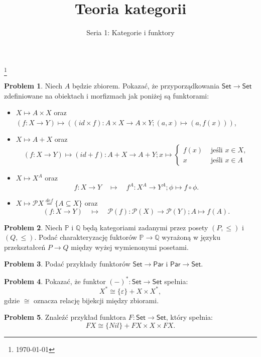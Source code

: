 \documentclass[10pt]{amsart}
\title{Teoria kategorii}
\author{Seria 1: Kategorie i funktory}
\theoremstyle{plain}
\theoremstyle{definition}
\newtheorem{problem}{Problem}
\numberwithin{equation}{section}
\newcommand\blfootnote[1]{%
  \begingroup
  \renewcommand\thefootnote{}\footnote{#1}%
  \addtocounter{footnote}{-1}%
  \endgroup
}
\begin{document}
\maketitle

\blfootnote{\today}


\begin{problem}
Niech $A$ będzie zbiorem. Pokazać, że przyporządkowania $\mathsf{Set}\to \mathsf{Set}$ zdefiniowane na obiektach i morfizmach jak poniżej są funktorami:
\begin{itemize}
\item $X\mapsto A\times X$ oraz $(f:X\to Y)\mapsto \left ((id \times f):A\times X\to A\times Y; (a,x)\mapsto (a,f(x))\right )$,
\item $X\mapsto A+ X$ oraz $$(f:X\to Y)\mapsto (id + f):A+ X\to A+ Y; x \mapsto \left \{ \begin{array}{cc}f(x)  &\text{ jeśli }x\in X, \\ x &\text{ jeśli }x\in A \end{array}\right. $$
\item $X\mapsto X^A$ oraz 
$$
f:X\to Y\quad \mapsto \quad f^A:X^A\to Y^A; \phi\mapsto f\circ \phi. 
$$
\item $X\mapsto \mathcal{P}X\stackrel{def}{=} \{ A\subseteq X \}$ oraz 
$$
(f:X\to Y)\quad \mapsto \quad \mathcal{P}(f):\mathcal{P}(X)\to \mathcal{P}(Y); A\mapsto f(A). 
$$
\end{itemize}
\end{problem}
%
\begin{problem}
Niech $\mathbb{P}$ i $\mathbb{Q}$ będą kategoriami zadanymi przez posety $(P,\leq)$ i $(Q,\leq)$. Podać charakteryzację fuktorów $\mathbb{P}\to \mathbb{Q}$ wyrażoną w języku przekształceń $P\to Q$ między wyżej wymienonymi posetami.
\end{problem}

\begin{problem}
Podać przykłady funktorów $\mathsf{Set}\to \mathsf{Par}$ i $\mathsf{Par}\to \mathsf{Set}$. 
\end{problem}

\begin{problem}
Pokazać, że funktor $(-)^\ast: \mathsf{Set}\to \mathsf{Set}$ spełnia:
$$
X^\ast \cong \{ \varepsilon \} + X\times X^\ast,
$$
gdzie $\cong$ oznacza relację bijekcji między zbiorami. 
\end{problem}

\begin{problem}
Znaleźć przykład funktora $F:\mathsf{Set}\to\mathsf{Set}$, który spełnia:
$$
FX \cong \{Nil\} + FX \times X \times FX.
$$
\end{problem}
\end{document}
